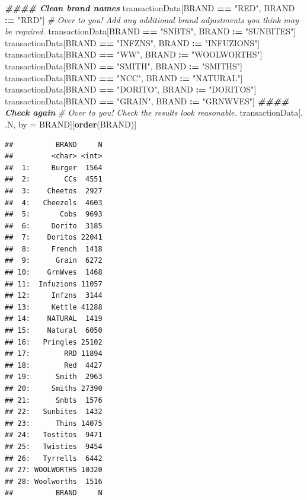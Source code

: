 \documentclass[
]{article}
\newenvironment{Shaded}{\begin{snugshade}}{\end{snugshade}}
\newcommand{\CommentTok}[1]{\textcolor[rgb]{0.56,0.35,0.01}{\textit{#1}}}
\newcommand{\DocumentationTok}[1]{\textcolor[rgb]{0.56,0.35,0.01}{\textbf{\textit{#1}}}}
\newcommand{\FunctionTok}[1]{\textcolor[rgb]{0.13,0.29,0.53}{\textbf{#1}}}
\newcommand{\NormalTok}[1]{#1}
\newcommand{\OtherTok}[1]{\textcolor[rgb]{0.56,0.35,0.01}{#1}}
\newcommand{\SpecialCharTok}[1]{\textcolor[rgb]{0.81,0.36,0.00}{\textbf{#1}}}
\newcommand{\StringTok}[1]{\textcolor[rgb]{0.31,0.60,0.02}{#1}}
\begin{document}
\begin{Shaded}
\begin{Highlighting}[]
\DocumentationTok{\#\#\#\# Clean brand names}
\NormalTok{transactionData[BRAND }\SpecialCharTok{==} \StringTok{"RED"}\NormalTok{, BRAND }\SpecialCharTok{:=} \StringTok{"RRD"}\NormalTok{]}
\CommentTok{\# Over to you! Add any additional brand adjustments you think may be required.}
\NormalTok{transactionData[BRAND }\SpecialCharTok{==} \StringTok{"SNBTS"}\NormalTok{, BRAND }\SpecialCharTok{:=} \StringTok{"SUNBITES"}\NormalTok{]}
\NormalTok{transactionData[BRAND }\SpecialCharTok{==} \StringTok{"INFZNS"}\NormalTok{, BRAND }\SpecialCharTok{:=} \StringTok{"INFUZIONS"}\NormalTok{]}
\NormalTok{transactionData[BRAND }\SpecialCharTok{==} \StringTok{"WW"}\NormalTok{, BRAND }\SpecialCharTok{:=} \StringTok{"WOOLWORTHS"}\NormalTok{]}
\NormalTok{transactionData[BRAND }\SpecialCharTok{==} \StringTok{"SMITH"}\NormalTok{, BRAND }\SpecialCharTok{:=} \StringTok{"SMITHS"}\NormalTok{]}
\NormalTok{transactionData[BRAND }\SpecialCharTok{==} \StringTok{"NCC"}\NormalTok{, BRAND }\SpecialCharTok{:=} \StringTok{"NATURAL"}\NormalTok{]}
\NormalTok{transactionData[BRAND }\SpecialCharTok{==} \StringTok{"DORITO"}\NormalTok{, BRAND }\SpecialCharTok{:=} \StringTok{"DORITOS"}\NormalTok{]}
\NormalTok{transactionData[BRAND }\SpecialCharTok{==} \StringTok{"GRAIN"}\NormalTok{, BRAND }\SpecialCharTok{:=} \StringTok{"GRNWVES"}\NormalTok{]}
\DocumentationTok{\#\#\#\# Check again}
\CommentTok{\# Over to you! Check the results look reasonable.}
\NormalTok{transactionData[, .N, by }\OtherTok{=}\NormalTok{ BRAND][}\FunctionTok{order}\NormalTok{(BRAND)]}
\end{Highlighting}
\end{Shaded}

\begin{verbatim}
##          BRAND     N
##         <char> <int>
##  1:     Burger  1564
##  2:        CCs  4551
##  3:    Cheetos  2927
##  4:   Cheezels  4603
##  5:       Cobs  9693
##  6:     Dorito  3185
##  7:    Doritos 22041
##  8:     French  1418
##  9:      Grain  6272
## 10:    GrnWves  1468
## 11:  Infuzions 11057
## 12:     Infzns  3144
## 13:     Kettle 41288
## 14:    NATURAL  1419
## 15:    Natural  6050
## 16:   Pringles 25102
## 17:        RRD 11894
## 18:        Red  4427
## 19:      Smith  2963
## 20:     Smiths 27390
## 21:      Snbts  1576
## 22:   Sunbites  1432
## 23:      Thins 14075
## 24:   Tostitos  9471
## 25:   Twisties  9454
## 26:   Tyrrells  6442
## 27: WOOLWORTHS 10320
## 28: Woolworths  1516
##          BRAND     N
\end{verbatim}
\end{document}
